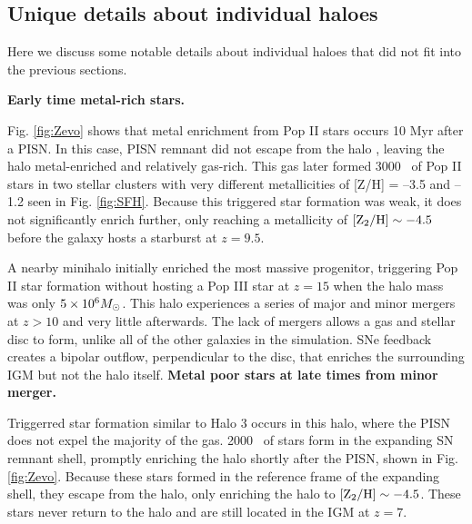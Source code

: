 \documentclass[useAMS,usenatbib]{mn2e}
\begin{document}

\subsection{Unique details about individual haloes}

Here we discuss some notable details about individual haloes that did
not fit into the previous sections.

 \textbf{Early time metal-rich stars.}

 Fig. \ref{fig:Zevo} shows that metal enrichment from Pop II
stars occurs 10 Myr after a PISN.  In this case, PISN remnant did not
escape from the halo \citep[cf.][]{Whalen08_SN}, leaving the halo
metal-enriched and relatively gas-rich.  This gas later formed 3000
\Ms~of Pop II stars in two stellar clusters with very different
metallicities of [Z/H] = --3.5 and --1.2 seen in Fig. \ref{fig:SFH}.
Because this triggered star formation was weak, it does not
significantly enrich further, only reaching a metallicity of $\ztwo
\sim -4.5$ before the galaxy hosts a starburst at $z = 9.5$.

 A nearby minihalo initially enriched the most massive
progenitor, triggering Pop II star formation without hosting a Pop III
star at $z=15$ when the halo mass was only $5 \times 10^6 \Ms$.  This
halo experiences a series of major and minor mergers at $z > 10$ and
very little afterwards.  The lack of mergers allows a gas and stellar
disc to form, unlike all of the other galaxies in the simulation.  SNe
feedback creates a bipolar outflow, perpendicular to the disc, that
enriches the surrounding IGM but not the halo itself.  \textbf{Metal
  poor stars at late times from minor merger.}

 Triggerred star formation similar to Halo 3 occurs in this
halo, where the PISN does not expel the majority of the gas.  2000
\Ms~of stars form in the expanding SN remnant shell, promptly
enriching the halo shortly after the PISN, shown in
Fig. \ref{fig:Zevo}.  Because these stars formed in the reference
frame of the expanding shell, they escape from the halo, only
enriching the halo to $\ztwo \sim -4.5$.  These stars never return to
the halo and are still located in the IGM at $z=7$.
\end{document}
